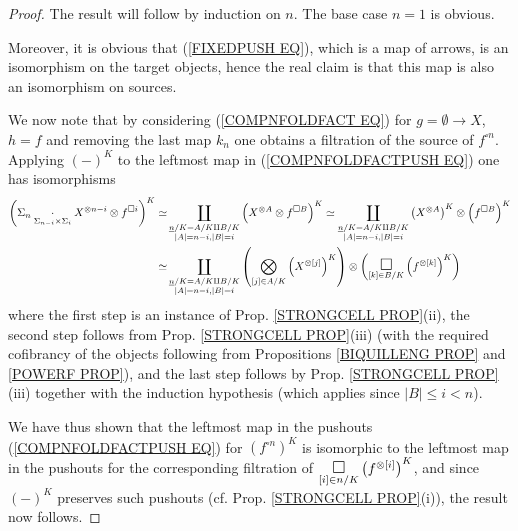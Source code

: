 \documentclass[a4paper,10pt]{article}%
\begin{document}
\begin{proof}
The result will follow by induction on $n$. The base case $n=1$ is obvious.

Moreover, it is obvious that (\ref{FIXEDPUSH EQ}), which is a map of arrows, is an isomorphism on the target objects, hence the real claim is that this map is also an isomorphism on sources.

We now note that by considering (\ref{COMPNFOLDFACT EQ}) for
$g=\emptyset \to X$, $h=f$ and removing the last map $k_n$
one obtains a filtration of the source of $f^{\square n}$.
Applying $(\minus)^K$ to the leftmost map in 
(\ref{COMPNFOLDFACTPUSH EQ})
one has isomorphisms
\begin{align*}
	\left(
	\Sigma_n \underset{\Sigma_{n-i} \times \Sigma_i}
	{\cdot} X^{\otimes n-i} \otimes f^{\square i}
	\right)^K
\simeq &
	\coprod_{\substack{\underline{n}/K=A/K \amalg B/K \\
	|A|=n-i,|B|=i}}
	\left( X^{\otimes A} \otimes f^{\square B} \right)^K
\simeq
	\coprod_{\substack{\underline{n}/K=A/K \amalg B/K \\
	|A|=n-i,|B|=i}} 
	\left( X^{\otimes A}\right)^K \otimes \left( f^{\square B} \right)^K
\\
\simeq &
	\coprod_{\substack{\underline{n}/K=A/K \amalg B/K \\
	|A|=n-i,|B|=i}} 
	\left(
	\bigotimes_{[j]\in A/K}\left( X^{\otimes [j]}\right)^K
	\right)
\otimes 
	\left(
	\underset{[k] \in B/K}
	{\mathlarger{\mathlarger{\square}}}
	\left(  f^{\otimes [k]} \right)^K
	\right)
\end{align*}
where the first step is an instance of Prop. \ref{STRONGCELL PROP}(ii), 
the second step follows from Prop. \ref{STRONGCELL PROP}(iii)
(with the required cofibrancy of the objects following from Propositions \ref{BIQUILLENG PROP} and \ref{POWERF PROP}),
and the last step follows by Prop. \ref{STRONGCELL PROP}(iii) together with the induction hypothesis (which applies since $|B|\leq i <n$).

We have thus shown that the leftmost map in the pushouts (\ref{COMPNFOLDFACTPUSH EQ}) for 
$\left( f^{\square n} \right)^K$
is isomorphic to the leftmost map in the pushouts for the corresponding filtration of 	
$\underset{[i] \in n/K}{\mathlarger{\mathlarger{\square}}}
\left( f^{\otimes [i]} \right)^K$,
and since $(\minus)^K$ preserves such pushouts (cf. Prop. \ref{STRONGCELL PROP}(i)), the result now follows.
\end{proof}
\end{document}
